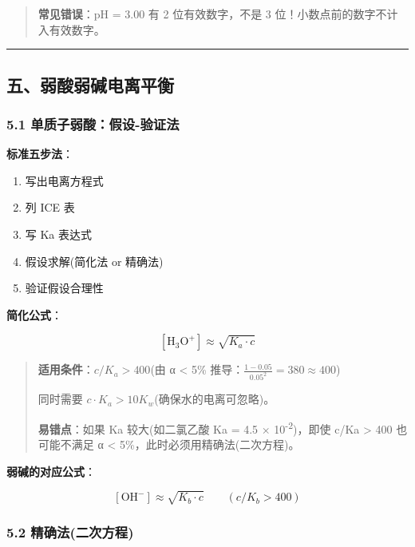 \begin{quote}
\textbf{常见错误}：pH = 3.00 有 2 位有效数字，不是 3 位！小数点前的数字不计入有效数字。
\end{quote}

\begin{center}\rule{0.5\linewidth}{0.5pt}\end{center}

\subsection{五、弱酸弱碱电离平衡}\label{ux4e94ux5f31ux9178ux5f31ux78b1ux7535ux79bbux5e73ux8861}

\subsubsection{5.1 单质子弱酸：假设-验证法}\label{ux5355ux8d28ux5b50ux5f31ux9178ux5047ux8bbe-ux9a8cux8bc1ux6cd5}

\textbf{标准五步法}：

\begin{enumerate}
\def\labelenumi{\arabic{enumi}.}
\tightlist
\item
  写出电离方程式
\item
  列 ICE 表
\item
  写 Ka 表达式
\item
  假设求解(简化法 or 精确法)
\item
  验证假设合理性
\end{enumerate}

\textbf{简化公式}：

\[
[\mathrm{H_3O^+}] \approx \sqrt{K_a \cdot c}
\]

\begin{quote}
\textbf{适用条件}：\(c/K_a > 400\)(由 α \textless{} 5\% 推导：\(\frac{1-0.05}{0.05^2} = 380 \approx 400\))

同时需要 \(c \cdot K_a > 10 K_w\)(确保水的电离可忽略)。

\textbf{易错点}：如果 Ka 较大(如二氯乙酸 Ka = 4.5 × 10\textsuperscript{-2})，即使 c/Ka \textgreater{} 400 也可能不满足 α \textless{} 5\%，此时必须用精确法(二次方程)。
\end{quote}

\textbf{弱碱的对应公式}：

\[
[\mathrm{OH^-}] \approx \sqrt{K_b \cdot c} \qquad (c/K_b > 400)
\]

\subsubsection{5.2 精确法(二次方程)}\label{ux7cbeux786eux6cd5ux4e8cux6b21ux65b9ux7a0b}

